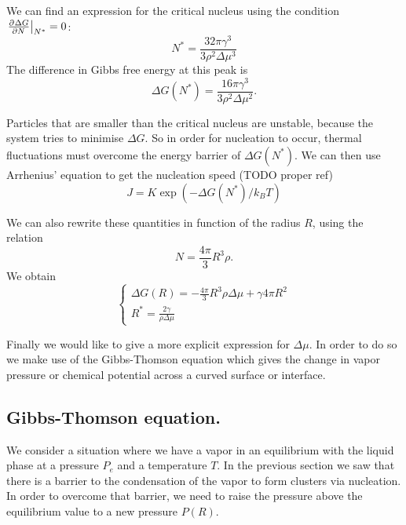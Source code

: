 We can find an expression for the critical nucleus using the condition $\left. \frac{\partial{^{}}\Delta G}{\partial{{N}^{}}} \right|_{N^*} = 0$:
\[ N^* = \frac{32 \pi \gamma^3}{3\rho^2 \Delta \mu^3} \]
The difference in Gibbs free energy at this peak is
\[ \Delta G(N^*) = \frac{16\pi\gamma^3}{3\rho^2\Delta \mu^2}. \]

Particles that are smaller than the critical nucleus are unstable, because the system tries to minimise $\Delta G$. So in order for nucleation to occur, thermal fluctuations must overcome the energy barrier of $\Delta G(N^*)$. We can then use Arrhenius' equation to get the nucleation speed (TODO proper ref)
\[ J = K \exp(-\Delta G(N^*)/k_B T) \]

We can also rewrite these quantities in function of the radius $R$, using the relation
\[ N = \frac{4\pi}{3}R^3 \rho. \]
We obtain
\[ \begin{cases}
\Delta G(R) = - \frac{4\pi}{3}R^3 \rho \Delta \mu + \gamma 4\pi R^2 \\
R^* = \frac{2\gamma}{\rho \Delta \mu}
\end{cases} \]

Finally we would like to give a more explicit expression for $\Delta \mu$. In order to do so we make use of the Gibbs-Thomson equation which gives the change in vapor pressure or chemical potential across a curved surface or interface.

\subsection{Gibbs-Thomson equation.}
We consider a situation where we have a vapor in an equilibrium with the liquid phase at a pressure $P_e$ and a temperature $T$. In the previous section we saw that there is a barrier to the condensation of the vapor to form clusters via nucleation. In order to overcome that barrier, we need to raise the pressure above the equilibrium value to a new pressure $P(R)$.

